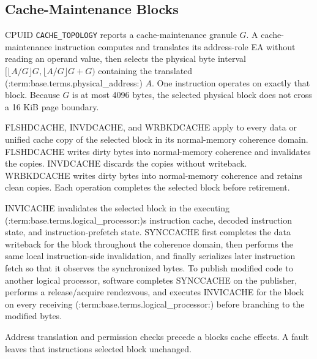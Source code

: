 \subsection{Cache-Maintenance Blocks}
CPUID \texttt{CACHE\_TOPOLOGY} reports a cache-maintenance granule $G$. A cache-maintenance instruction computes and
translates its address-role EA without reading an operand value, then selects the physical byte interval
$[\lfloor A/G\rfloor G,\lfloor A/G\rfloor G+G)$ containing the translated (:term:base.terms.physical_address:) $A$. One instruction
operates on exactly that block. Because $G$ is at most 4096 bytes, the selected physical block does not cross a
16 KiB page boundary.

FLSHDCACHE, INVDCACHE, and WRBKDCACHE apply to every data or unified cache copy of the selected block in its
normal-memory coherence domain. FLSHDCACHE writes dirty bytes into normal-memory coherence and invalidates the
copies. INVDCACHE discards the copies without writeback. WRBKDCACHE writes dirty bytes into normal-memory coherence
and retains clean copies. Each operation completes the selected block before retirement.

INVICACHE invalidates the selected block in the executing (:term:base.terms.logical_processor:)\textquotesingle{}s instruction cache, decoded
instruction state, and instruction-prefetch state. SYNCCACHE first completes the data writeback for the block
throughout the coherence domain, then performs the same local instruction-side invalidation, and finally serializes
later instruction fetch so that it observes the synchronized bytes. To publish modified code to another logical
processor, software completes SYNCCACHE on the publisher, performs a release/acquire rendezvous, and executes
INVICACHE for the block on every receiving (:term:base.terms.logical_processor:) before branching to the modified bytes.

Address translation and permission checks precede a block\textquotesingle{}s cache effects. A fault leaves that instruction\textquotesingle{}s
selected block unchanged.
